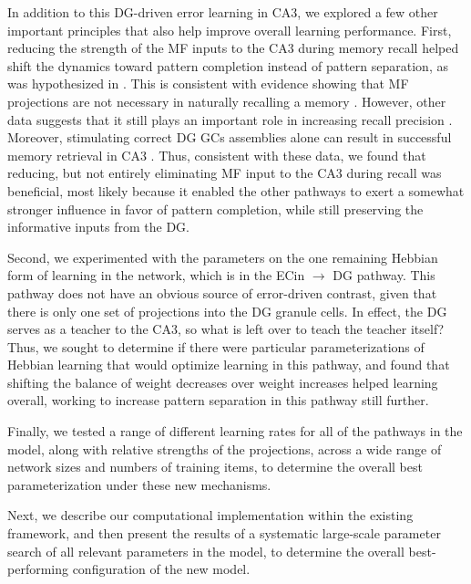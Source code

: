 \documentclass[11pt,twoside]{article}
\newif\myifpdf
\begin{document}
In addition to this DG-driven error learning in CA3, we explored a few other important principles that also help improve overall learning performance.  First, reducing the strength of the MF inputs to the CA3 during memory recall helped shift the dynamics toward pattern completion instead of pattern separation, as was hypothesized in \citet{OReillyMcClelland94}.  This is consistent with evidence showing that MF projections are not necessary in naturally recalling a memory \citep{NakashibaCushmanPelkeyEtAl12,BernierLacagninaAyoubEtAl17}.  However, other data suggests that it still plays an important role in increasing recall precision \citep{RuedigerVittoriBednarekEtAl11,NakashibaCushmanPelkeyEtAl12,BernierLacagninaAyoubEtAl17,PignatelliRyanRoyEtAl19}. Moreover, stimulating correct DG GCs assemblies alone can result in successful memory retrieval in CA3 \citep{cites}.  Thus, consistent with these data, we found that reducing, but not entirely eliminating MF input to the CA3 during recall was beneficial, most likely because it enabled the other pathways to exert a somewhat stronger influence in favor of pattern completion, while still preserving the informative inputs from the DG.

Second, we experimented with the parameters on the one remaining Hebbian form of learning in the network, which is in the ECin $\rightarrow$ DG pathway.  This pathway does not have an obvious source of error-driven contrast, given that there is only one set of projections into the DG granule cells.  In effect, the DG serves as a teacher to the CA3, so what is left over to teach the teacher itself?  Thus, we sought to determine if there were particular parameterizations of Hebbian learning that would optimize learning in this pathway, and found that shifting the balance of weight decreases over weight increases helped learning overall, working to increase pattern separation in this pathway still further.

Finally, we tested a range of different learning rates for all of the pathways in the model, along with relative strengths of the projections, across a wide range of network sizes and numbers of training items, to determine the overall best parameterization under these new mechanisms.

Next, we describe our computational implementation within the existing \citet{KetzMorkondaOReilly13} framework, and then present the results of a systematic large-scale parameter search of all relevant parameters in the model, to determine the overall best-performing configuration of the new model. 
\end{document}

